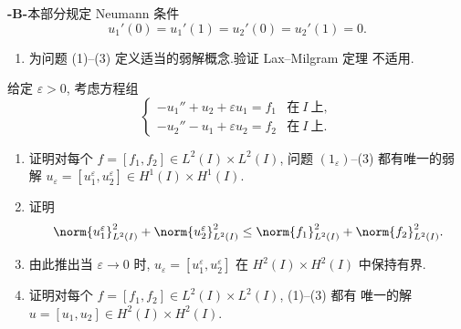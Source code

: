 \begin{exercise}
\noindent\textbf{-B-}\quad 本部分规定 Neumann 条件
\begin{equation}
u_1'(0)=u_1'(1)=u_2'(0)=u_2'(1)=0.
\tag{3}
\end{equation}
\begin{enumerate}[label=\arabic*., leftmargin=2.2em, itemsep=0.3em]
	\item 为问题 (1)--(3) 定义适当的弱解概念.验证 Lax--Milgram 定理
	      不适用.
\end{enumerate}
给定 $\varepsilon>0$, 考虑方程组
\begin{equation}
\begin{cases}
-u_1''+u_2+\varepsilon u_1=f_1 & \text{在}\ I\ \text{上},\\
-u_2''-u_1+\varepsilon u_2=f_2 & \text{在}\ I\ \text{上}.
\end{cases}
\tag{$1_\varepsilon$}
\end{equation}
\begin{enumerate}[label=\arabic*., leftmargin=2.2em, itemsep=0.3em, start=2]
	\item 证明对每个 $f=[f_1,f_2]\in L^2(I)\times L^2(I)$, 问题
	      $(1_\varepsilon)$--(3) 都有唯一的弱解
	      $u_\varepsilon=[u_1^\varepsilon,u_2^\varepsilon]
	      \in H^1(I)\times H^1(I)$.
	\item 证明
	      \begin{equation*}
	      \norm{u_1^\varepsilon}_{L^2(I)}^2+\norm{u_2^\varepsilon}_{L^2(I)}^2
	      \le\norm{f_1}_{L^2(I)}^2+\norm{f_2}_{L^2(I)}^2.
	      \end{equation*}
	\item 由此推出当 $\varepsilon\to0$ 时,
	      $u_\varepsilon=[u_1^\varepsilon,u_2^\varepsilon]$ 在
	      $H^2(I)\times H^2(I)$ 中保持有界.
	\item 证明对每个 $f=[f_1,f_2]\in L^2(I)\times L^2(I)$, (1)--(3) 都有
	      唯一的解 $u=[u_1,u_2]\in H^2(I)\times H^2(I)$.
\end{enumerate}
\end{exercise}

